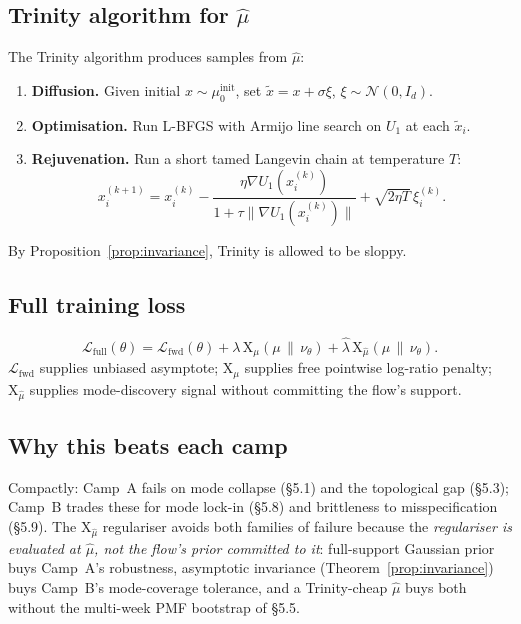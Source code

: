 \documentclass[11pt,letterpaper]{article}
\newcommand{\Xfun}{\mathrm{X}}
\theoremstyle{plain}
\begin{document}
\subsection{Trinity algorithm for $\hat\mu$}

The Trinity algorithm produces samples from $\hat\mu$:
\begin{enumerate}\setlength{\itemsep}{2pt}
  \item \textbf{Diffusion.} Given initial $x\sim\mu_0^{\mathrm{init}}$, set
    $\tilde x = x + \sigma\xi$, $\xi\sim\mathcal N(0,I_d)$.
  \item \textbf{Optimisation.} Run L-BFGS with Armijo line search on $U_1$ at
    each $\tilde x_i$.
  \item \textbf{Rejuvenation.} Run a short tamed Langevin chain at temperature
    $T$:
  \[
    x^{(k+1)}_i = x^{(k)}_i - \frac{\eta\nabla U_1(x^{(k)}_i)}{1+\tau\|\nabla U_1(x^{(k)}_i)\|} + \sqrt{2\eta T}\,\xi^{(k)}_i.
  \]
\end{enumerate}
By Proposition~\ref{prop:invariance}, Trinity is allowed to be sloppy.

\subsection{Full training loss}

\[
  \mathcal L_{\mathrm{full}}(\theta) = \mathcal L_{\mathrm{fwd}}(\theta) + \lambda\,\Xfun_\mu(\mu\,\|\,\nu_\theta) + \hat\lambda\,\Xfun_{\hat\mu}(\mu\,\|\,\nu_\theta).
\]
$\mathcal L_{\mathrm{fwd}}$ supplies unbiased asymptote; $\Xfun_\mu$ supplies
free pointwise log-ratio penalty; $\Xfun_{\hat\mu}$ supplies mode-discovery
signal without committing the flow's support.

\subsection{Why this beats each camp}

Compactly: Camp~A fails on mode collapse (\S5.1) and the topological gap
(\S5.3); Camp~B trades these for mode lock-in (\S5.8) and brittleness to
misspecification (\S5.9). The $\Xfun_{\hat\mu}$ regulariser avoids both
families of failure because the \emph{regulariser is evaluated at $\hat\mu$,
not the flow's prior committed to it}: full-support Gaussian prior buys
Camp~A's robustness, asymptotic invariance (Theorem~\ref{prop:invariance})
buys Camp~B's mode-coverage tolerance, and a Trinity-cheap $\hat\mu$ buys
both without the multi-week PMF bootstrap of \S5.5.
\end{document}
